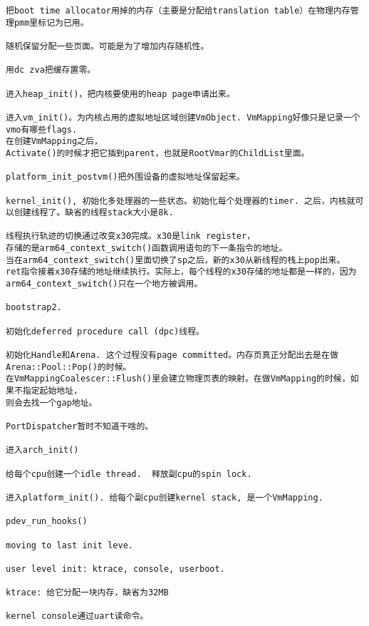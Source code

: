 \begin{verbatim}
把boot time allocator用掉的内存（主要是分配给translation table）在物理内存管理pmm里标记为已用。

随机保留分配一些页面。可能是为了增加内存随机性。

用dc zva把缓存置零。

进入heap_init()，把内核要使用的heap page申请出来。

进入vm_init()。为内核占用的虚拟地址区域创建VmObject. VmMapping好像只是记录一个vmo有哪些flags. 
在创建VmMapping之后，
Activate()的时候才把它插到parent，也就是RootVmar的ChildList里面。

platform_init_postvm()把外围设备的虚拟地址保留起来。

kernel_init(), 初始化多处理器的一些状态。初始化每个处理器的timer. 之后，内核就可以创建线程了。缺省的线程stack大小是8k.

线程执行轨迹的切换通过改变x30完成。x30是link register，
存储的是arm64_context_switch()函数调用语句的下一条指令的地址。
当在arm64_context_switch()里面切换了sp之后，新的x30从新线程的栈上pop出来。
ret指令接着x30存储的地址继续执行。实际上，每个线程的x30存储的地址都是一样的，因为
arm64_context_switch()只在一个地方被调用。

bootstrap2.

初始化deferred procedure call (dpc)线程。

初始化Handle和Arena. 这个过程没有page committed。内存页真正分配出去是在做Arena::Pool::Pop()的时候。
在VmMappingCoalescer::Flush()里会建立物理页表的映射。在做VmMapping的时候，如果不指定起始地址，
则会去找一个gap地址。

PortDispatcher暂时不知道干啥的。

进入arch_init()

给每个cpu创建一个idle thread.  释放副cpu的spin lock.

进入platform_init(). 给每个副cpu创建kernel stack, 是一个VmMapping.

pdev_run_hooks()

moving to last init leve.

user level init: ktrace, console, userboot.

ktrace: 给它分配一块内存，缺省为32MB

kernel console通过uart读命令。

\end{verbatim}













